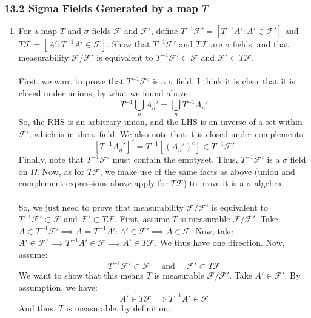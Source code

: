 \documentclass[12pt,a4paper]{article}
\newcommand{\1}[1]{\mathbbm{1}\left\{ #1 \right\}}
\newcommand{\fcal}{\mathcal{F}}
\begin{document}
\subsubsection{13.2 Sigma Fields Generated by a map $T$}
\begin{enumerate}
	\item For a map $T$ and $\sigma$ fields $\fcal$ and $\fcal'$, define $T^{-1}\fcal' = \left[T^{-1} A' : A' \in \fcal'\right]$ and $T\fcal = \left[A' : T^{-1}A' \in \fcal\right]$. Show that $T^{-1}\fcal'$ and $T\fcal$ are $\sigma$ fields, and that measurability $\fcal/\fcal'$ is equivalent to $T^{-1}\fcal' \subset \fcal$ and $\fcal' \subset T\fcal$.
	\\\\
	First, we want to prove that $T^{-1}\fcal'$ is a $\sigma$ field. I think it is clear that it is closed under unions, by what we found above:
	$$
		T^{-1}\bigcup_n A_n' = \bigcup_n T^{-1} A_n'
	$$
	So, the RHS is an arbitrary union, and the LHS is an inverse of a set within $\fcal'$, which is in the $\sigma$ field. We also note that it is closed under complements:
	$$
		\left[T^{-1}A_n'\right]^c = T^{-1}\left[(A_n')^c\right] \in T^{-1}\fcal'
	$$
	Finally, note that $T^{-1}\fcal'$ must contain the emptyset. Thus, $T^{-1}\fcal'$ is a $\sigma$ field on $\Omega$. Now, as for $T\fcal$, we make use of the same facts as above (union and complement expressions above apply for $T\fcal$) to prove it is a $\sigma$ algebra.
	\\\\
	So, we just need to prove that measurability $\fcal/\fcal'$ is equivalent to $T^{-1}\fcal' \subset \fcal$ and $\fcal' \subset T\fcal$. First, assume $T$ is measurable $\fcal/\fcal'$. Take $A \in T^{-1}\fcal' \implies A = T^{-1} A' : A' \in \fcal' \implies A \in \fcal$. Now, take $A' \in \fcal' \implies T^{-1}A' \in \fcal \implies A' \in T\fcal$. We thus have one direction. Now, assume:
	$$
		T^{-1}\fcal' \subset \fcal \quad\text{ and }\quad \fcal' \subset T\fcal
	$$
	We want to show that this means $T$ is measurable $\fcal/\fcal'$. Take $A' \in \fcal'$. By assumption, we have:
	$$
		A' \in T\fcal \implies T^{-1}A' \in \fcal
	$$
	And thus, $T$ is measurable, by definition.
	

\end{enumerate}
\end{document}

